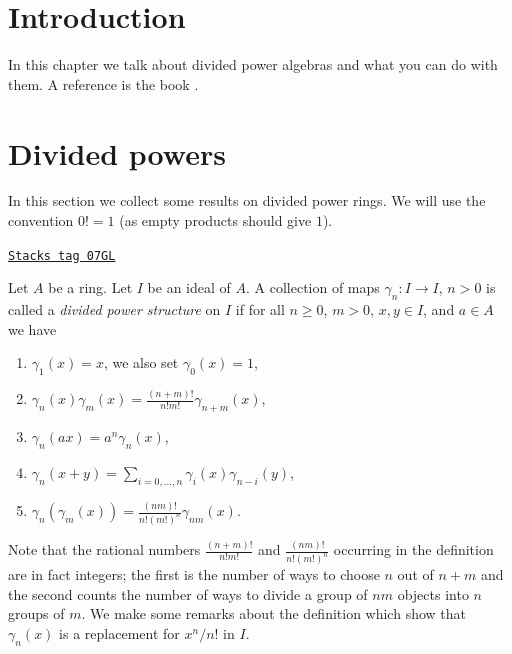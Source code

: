 \section{Introduction}
\label{dpa-section-introduction}
In this chapter we talk about divided power algebras and what
you can do with them. A reference is the book \cite{Berthelot}.

\section{Divided powers}
\label{dpa-section-divided-powers}
In this section we collect some results on divided power rings.
We will use the convention $0! = 1$ (as empty products should give $1$).

\begin{definition}
\label{dpa-definition-divided-powers}
\href{https://stacks.math.columbia.edu/tag/07GL}{\texttt{Stacks tag 07GL}}

Let $A$ be a ring. Let $I$ be an ideal of $A$. A collection of maps
$\gamma_n : I \to I$, $n > 0$ is called a {\it divided power structure}
on $I$ if for all $n \geq 0$, $m > 0$, $x, y \in I$, and $a \in A$ we have
\begin{enumerate}
\item $\gamma_1(x) = x$, we also set $\gamma_0(x) = 1$,
\item $\gamma_n(x)\gamma_m(x) = \frac{(n + m)!}{n! m!} \gamma_{n + m}(x)$,
\item $\gamma_n(ax) = a^n \gamma_n(x)$,
\item $\gamma_n(x + y) = \sum_{i = 0, \ldots, n} \gamma_i(x)\gamma_{n - i}(y)$,
\item $\gamma_n(\gamma_m(x)) = \frac{(nm)!}{n! (m!)^n} \gamma_{nm}(x)$.
\end{enumerate}
\end{definition}

Note that the rational numbers $\frac{(n + m)!}{n! m!}$
and $\frac{(nm)!}{n! (m!)^n}$ occurring in the definition are in fact integers;
the first is the number of ways to choose $n$ out of $n + m$ and
the second counts the number of ways to divide a group of $nm$
objects into $n$ groups of $m$.
We make some remarks about the definition which show that
$\gamma_n(x)$ is a replacement for $x^n/n!$ in $I$.


